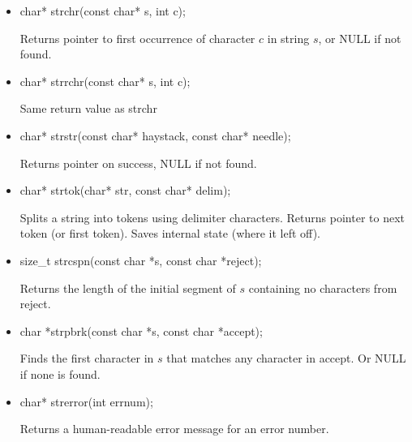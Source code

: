 \documentclass{report}
\begin{document}
\begin{itemize}
\begin{cppcode}
            char *strncat(char *dest, const char *src, size_t n);
            \end{cppcode}
            \bigbreak \noindent 
            Returns dest
        \item
            \bigbreak \noindent 
            \begin{cppcode}
                char* strchr(const char* s, int c);
            \end{cppcode}
            \bigbreak \noindent 
            Returns pointer to first occurrence of character $c$ in string $s$, or NULL if not found.
        \item
            \bigbreak \noindent 
            \begin{cppcode}
                char* strrchr(const char* s, int c);
            \end{cppcode}
            \bigbreak \noindent 
            Same return value as strchr
        \item
            \bigbreak \noindent 
            \begin{cppcode}
                char* strstr(const char* haystack, const char* needle);
            \end{cppcode}
            \bigbreak \noindent 
            Returns pointer on success, NULL if not found.
        \item
            \bigbreak \noindent 
            \begin{cppcode}
            char* strtok(char* str, const char* delim);
            \end{cppcode}
            \bigbreak \noindent 
            Splits a string into tokens using delimiter characters. 
            \bigbreak \noindent 
            Returns pointer to next token (or first token). 
            \bigbreak \noindent 
            Saves internal state (where it left off).
        \item
            \bigbreak \noindent 
            \begin{cppcode}
            size_t strcspn(const char *s, const char *reject);
            \end{cppcode}
            \bigbreak \noindent 
            Returns the length of the initial segment of $s$ containing no characters from reject.
        \item
            \bigbreak \noindent 
            \begin{cppcode}
            char *strpbrk(const char *s, const char *accept);
            \end{cppcode}
            \bigbreak \noindent 
            Finds the first character in $s$ that matches any character in accept. Or NULL if none is found.
        \item 
            \bigbreak \noindent 
            \begin{cppcode}
            char* strerror(int errnum);
            \end{cppcode}
            \bigbreak \noindent 
            Returns a human-readable error message for an error number.
    \end{itemize}
\end{document}

